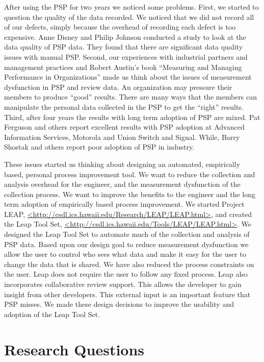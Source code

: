 \documentclass[12pt]{article}
\begin{document}
After using the PSP for two years we noticed some problems.  First, we
started to question the quality of the data recorded.  We noticed that we
did not record all of our defects, simply because the overhead of recording
each defect is too expensive.  Anne Disney and Philip Johnson conducted a
study to look at the data quality of PSP data.  They found that there are
significant data quality issues with manual PSP.\cite{Disney98, Disney98a}
Second, our experiences with industrial partners and management practices
and Robert Austin's book ``Measuring and Managing Performance in
Organizations''\cite{Austin96} made us think about the issues of
measurement dysfunction in PSP and review data.  An organization may
pressure their members to produce ``good'' results.  There are many ways
that the members can manipulate the personal data collected in the PSP to
get the ``right'' results.  Third, after four years the results with long
term adoption of PSP are mixed.  Pat Ferguson and others report excellent
results with PSP adoption at Advanced Information Services, Motorola and
Union Switch and Signal\cite{Ferguson97}.  While, Barry Shostak and others
report poor adoption of PSP in industry\cite{Shostak96,Emam96}.

These issues started us thinking about designing an automated, empirically
based, personal process improvement tool.  We want to reduce the collection
and analysis overhead for the engineer, and the measurement dysfunction of
the collection process.  We want to improve the benefits to the engineer
and the long term adoption of empirically based process improvement.  We
started Project LEAP,
\url{<http://csdl.ics.hawaii.edu/Research/LEAP/LEAP.html>}, and created the
Leap Tool Set, \url{<http://csdl.ics.hawaii.edu/Tools/LEAP/LEAP.html>}.  We
designed the Leap Tool Set to automate much of the collection and analysis
of PSP data.  Based upon our design goal to reduce measurement dysfunction
we allow the user to control who sees what data and make it easy for the
user to change the data that is shared.  We have also reduced the process
constraints on the user.  Leap does not require the user to follow any
fixed process.  Leap also incorporates collaborative review support.  This
allows the developer to gain insight from other developers.  This external
input is an important feature that PSP misses.  We made these design
decisions to improve the usability and adoption of the Leap Tool Set.



\section*{Research Questions}
\end{document}
